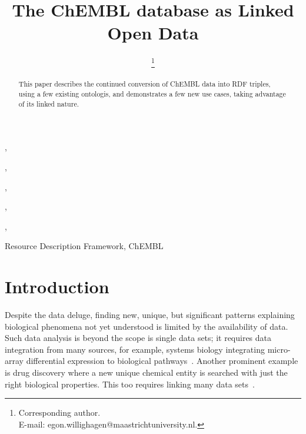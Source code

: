 \documentclass[sw]{iosart2c}
\begin{document}
\begin{frontmatter}

\title{The ChEMBL database as Linked Open Data}



\author[A]{ \thanks{Corresponding author.\\ E-mail: egon.willighagen@maastrichtuniversity.nl.}}
\author[B]{ },
\author[C]{ },
\author[D]{ },
\author[E]{ },
\author[E]{ },

\address[A]{Department of Bioinformatics - BiGCaT, Maastricht University, ADDRESS, Maastricht,\\ The Netherlands\\
E-mail: egon.willighagen@maastrichtuniversity.nl}
\address[B]{Uppsala University}
\address[C]{University of Queensland}
\address[D]{xxx}
\address[E]{European Bioinformatics Institute}

\begin{abstract}
This paper describes the continued conversion of ChEMBL data into RDF triples, using a few existing
ontologis, and demonstrates a few new use cases, taking advantage of its linked nature.
\end{abstract}

\begin{keyword}
Resource Description Framework, ChEMBL
\end{keyword}

\end{frontmatter}


\section{Introduction}\label{s1}

Despite the data deluge, finding new, unique, but significant patterns explaining biological
phenomena not yet understood is limited by the availability of data. Such data analysis is
beyond the scope is single data sets; it requires data integration from many sources, for
example, systems biology integrating micro-array differential expression to biological
pathways~\cite{}. Another prominent example is drug discovery where a new unique chemical entity is
searched with just the right biological properties. This too requires linking many
data sets~\cite{Samwald2011,OpenPHACTS}.
\end{document}
